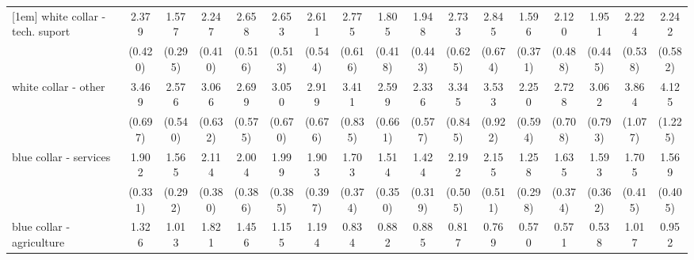 {\begin{tabular}{l*{16}{c}}
[1em]
white collar - tech. suport&       2.379\sym{***}&       1.577\sym{*}  &       2.247\sym{***}&       2.658\sym{***}&       2.653\sym{***}&       2.611\sym{***}&       2.775\sym{***}&       1.805\sym{*}  &       1.948\sym{**} &       2.733\sym{***}&       2.845\sym{***}&       1.596\sym{*}  &       2.120\sym{**} &       1.951\sym{**} &       2.224\sym{***}&       2.242\sym{**} \\
                    &     (0.420)         &     (0.295)         &     (0.410)         &     (0.516)         &     (0.513)         &     (0.544)         &     (0.616)         &     (0.418)         &     (0.443)         &     (0.625)         &     (0.674)         &     (0.371)         &     (0.488)         &     (0.445)         &     (0.538)         &     (0.582)         \\
[1em]
white collar - other&       3.469\sym{***}&       2.576\sym{***}&       3.066\sym{***}&       2.699\sym{***}&       3.050\sym{***}&       2.919\sym{***}&       3.411\sym{***}&       2.599\sym{***}&       2.336\sym{***}&       3.345\sym{***}&       3.533\sym{***}&       2.250\sym{**} &       2.728\sym{***}&       3.062\sym{***}&       3.864\sym{***}&       4.125\sym{***}\\
                    &     (0.697)         &     (0.540)         &     (0.632)         &     (0.575)         &     (0.670)         &     (0.676)         &     (0.835)         &     (0.661)         &     (0.577)         &     (0.845)         &     (0.922)         &     (0.594)         &     (0.708)         &     (0.793)         &     (1.077)         &     (1.225)         \\
[1em]
blue collar - services&       1.902\sym{***}&       1.565\sym{*}  &       2.114\sym{***}&       2.004\sym{***}&       1.999\sym{***}&       1.903\sym{**} &       1.703\sym{*}  &       1.514         &       1.424         &       2.192\sym{***}&       2.155\sym{**} &       1.258         &       1.635\sym{*}  &       1.593\sym{*}  &       1.705\sym{*}  &       1.569         \\
                    &     (0.331)         &     (0.292)         &     (0.380)         &     (0.386)         &     (0.385)         &     (0.397)         &     (0.374)         &     (0.350)         &     (0.319)         &     (0.505)         &     (0.511)         &     (0.298)         &     (0.374)         &     (0.362)         &     (0.415)         &     (0.405)         \\
[1em]
blue collar - agriculture&       1.326         &       1.013         &       1.821\sym{*}  &       1.456         &       1.155         &       1.194         &       0.834         &       0.882         &       0.885         &       0.817         &       0.769         &       0.570         &       0.571         &       0.538         &       1.017         &       0.952         \\

\end{tabular}}
